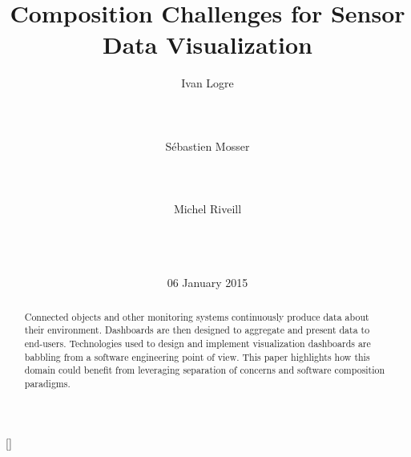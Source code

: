 \documentclass{acm_proc_article-sp}
\begin{document}
\title{Composition Challenges for Sensor Data Visualization}

 \author{
  \alignauthor Ivan Logre\\
  \\
  \\
  \\
  \alignauthor S{\'e}bastien Mosser\\
  \\
  \\
  \\
  \alignauthor Michel Riveill\\
  \\
  \\
  \\
   }

\date{06 January 2015}

\maketitle
\begin{abstract}
  Connected objects and other monitoring systems continuously produce
  data about their environment. Dashboards are then designed to
  aggregate and present data to end-users.
  Technologies used to design and implement visualization dashboards
  are babbling from a software engineering point of view. This paper
  highlights how this domain could benefit from leveraging separation
  of concerns and software composition paradigms.
\end{abstract}

[]

\end{document}
